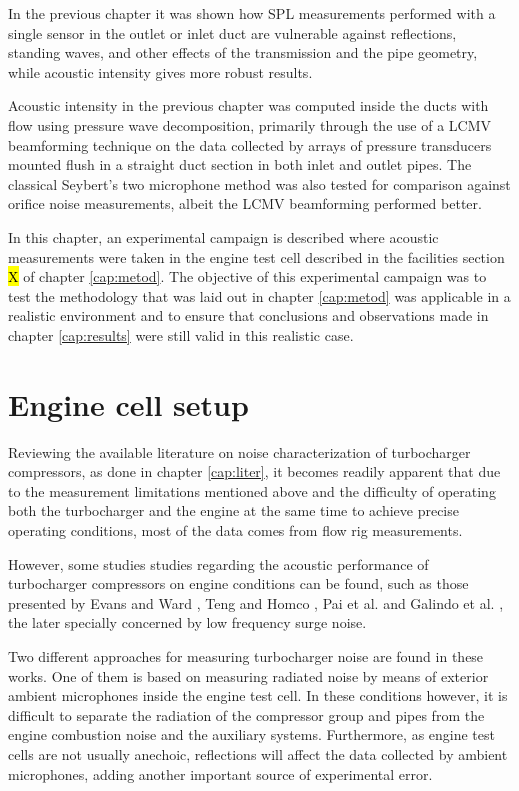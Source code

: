 In the previous chapter it was shown how SPL measurements performed with a single sensor in the outlet or inlet duct are vulnerable against reflections, standing waves, and other effects of the transmission and the pipe geometry, while acoustic intensity gives more robust results.

Acoustic intensity in the previous chapter was computed inside the ducts with flow using pressure wave decomposition, primarily through the use of a LCMV beamforming technique on the data collected by arrays of pressure transducers mounted flush in a straight duct section in both inlet and outlet pipes. The classical Seybert's two microphone method \cite{seybert1988two} was also tested for comparison against orifice noise measurements, albeit the LCMV beamforming performed better.

In this chapter, an experimental campaign is described where acoustic measurements were taken in the engine test cell described in the facilities section \hl{X} of chapter \ref{cap:metod}. The objective of this experimental campaign was to test the methodology that was laid out in chapter \ref{cap:metod} was applicable in a realistic environment and to ensure that conclusions and observations made in chapter \ref{cap:results} were still valid in this realistic case.

\section{Engine cell setup}
\label{sec:experimental_characterization}

Reviewing the available literature on noise characterization of turbocharger compressors, as done in chapter \ref{cap:liter}, it becomes readily apparent that due to the measurement limitations mentioned above and the difficulty of operating both the turbocharger and the engine at the same time to achieve precise operating conditions, most of the data comes from flow rig measurements.

However, some studies studies regarding the acoustic performance of turbocharger compressors on engine conditions can be found, such as those presented by Evans and Ward \cite{evans2005minimizing,evans2006reduction}, Teng and Homco \cite{teng2009investigation},  Pai et al. \cite{pai2013air,pai2015turbocharger} and Galindo et al. \cite{galindo2013engine,galindo2011measurement,galindo2008experiments}, the later specially concerned by low frequency surge noise.

Two different approaches for measuring turbocharger noise are found  in these works. One of them is based on measuring radiated noise by means of exterior ambient microphones inside the engine test cell. In these conditions however, it is difficult to separate the radiation of the compressor group and pipes from the engine combustion noise and the auxiliary systems. Furthermore, as engine test cells are not usually anechoic, reflections will affect the data collected by ambient microphones, adding another important source of experimental error.

